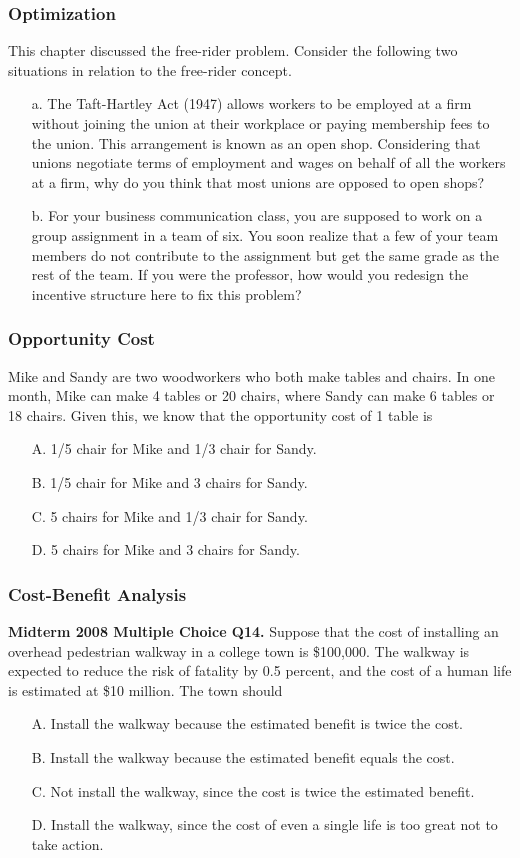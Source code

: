 \documentclass[12pt, xcolor=dvipsnames]{beamer}
\begin{document}
\begin{frame}
\frametitle{\bf Optimization}
\small 
{}
This chapter discussed the free-rider problem. Consider the following two situations in relation to the free-rider concept.
\begin{enumerate}
\item[a.] The Taft-Hartley Act (1947) allows workers to be employed at a firm without joining the union at their workplace or paying membership fees to the union. This arrangement is known as an open shop. Considering that unions negotiate terms of employment and wages on behalf of all the workers at a firm, why do you think that most unions are opposed to open shops? 
\item[b.] For your business communication class, you are supposed to work on a group assignment in a team of six. You soon realize that a few of your team members do not contribute to the assignment but get the same grade as the rest of the team. If you were the professor, how would you redesign the incentive structure here to fix this problem? 
\end{enumerate}
\end{frame}


\begin{frame}
\frametitle{\bf Opportunity Cost}
\small 
{}
Mike and Sandy are two woodworkers who both make tables and chairs. In one month, Mike can make 4 tables or 20 chairs, where Sandy can make 6 tables or 18 chairs. Given this, we know that the opportunity cost of 1 table is
\begin{enumerate}\itemsep-0.5ex
\item[A.] 1/5 chair for Mike and 1/3 chair for Sandy. 
\item[B.] 1/5 chair for Mike and 3 chairs for Sandy.
\item[C.] 5 chairs for Mike and 1/3 chair for Sandy.
\item[D.] 5 chairs for Mike and 3 chairs for Sandy. 
\end{enumerate}
\end{frame}


\begin{frame}
\frametitle{\bf Cost-Benefit Analysis}
\small 
{\bfseries Midterm 2008 Multiple Choice Q14.}
Suppose that the cost of installing an overhead pedestrian walkway in a college town is \$100,000. The walkway is expected to reduce the risk of fatality by 0.5 percent, and the cost of a human life is estimated at \$10 million. The town should
\begin{enumerate}\itemsep-0.5ex
\item[A.] Install the walkway because the estimated benefit is twice the cost.
\item[B.] Install the walkway because the estimated benefit equals the cost.
\item[C.] Not install the walkway, since the cost is twice the estimated benefit.
\item[D.] Install the walkway, since the cost of even a single life is too great not to take action. 
\end{enumerate}
\end{frame}
\end{document}
